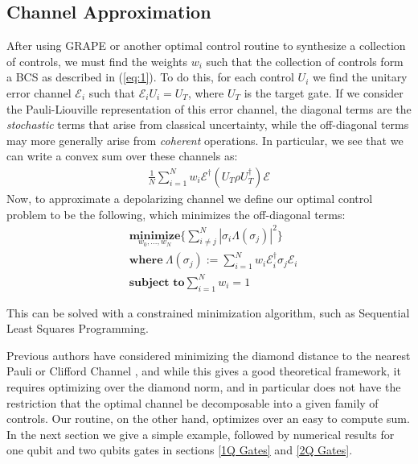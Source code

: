 \documentclass[aps,nofootinbib,pra,notitlepage,twocolumn]{revtex4-1}
\begin{document}
\subsection{Channel Approximation}
After using GRAPE or another optimal control routine to synthesize a collection of controls, we must find the weights $w_i$ such that the collection of controls form a BCS as described in (\ref{eq:1}). To do this, for each control $U_i$ we find the unitary error channel $\mathcal{E}_i$ such that $\mathcal{E}_iU_i=U_T$, where $U_T$ is the target gate. If we consider the Pauli-Liouville representation of this error channel, the diagonal terms are the \textit{stochastic} terms that arise from classical uncertainty, while the off-diagonal terms may more generally arise from \textit{coherent} operations. In particular, we see that we can write a convex sum over these channels as:
\begin{align}
 \frac{1}{N} \sum^N_{i=1} w_i \mathcal{E}^{\dagger} (U_T\rho U_T^{\dagger}) \mathcal{E}
\end{align}
Now, to approximate a depolarizing channel we define our optimal control problem to be the following, which minimizes the off-diagonal terms:
\begin{equation}\label{eq:minimization}
  \begin{split}
    &\underset{w_0, ..., w_N}{\textbf{minimize}} \{\sum_{i\neq j}^N|\sigma_i\Lambda(\sigma_j)|^2\}\\
    &\textbf{where}\ \Lambda(\sigma_j) := \sum^N_{i=1}w_i\mathcal{E}_i^{\dagger}\sigma_j\mathcal{E}_i\\
    &\textbf{subject to} \sum_{i=1}^Nw_i = 1
  \end{split}
\end{equation}

This can be solved with a constrained minimization algorithm, such as Sequential Least Squares Programming\cite{wright1999numerical}.

Previous authors have considered minimizing the diamond distance to the nearest Pauli or Clifford Channel \cite{Magesan2013}, and while this gives a good theoretical framework, it requires optimizing over the diamond norm, and in particular does not have the restriction that the optimal channel be decomposable into a given family of controls. Our routine, on the other hand, optimizes over an easy to compute sum. In the next section we give a simple example, followed by numerical results for one qubit and two qubits gates in sections \ref{1Q Gates} and \ref{2Q Gates}.
\end{document}
